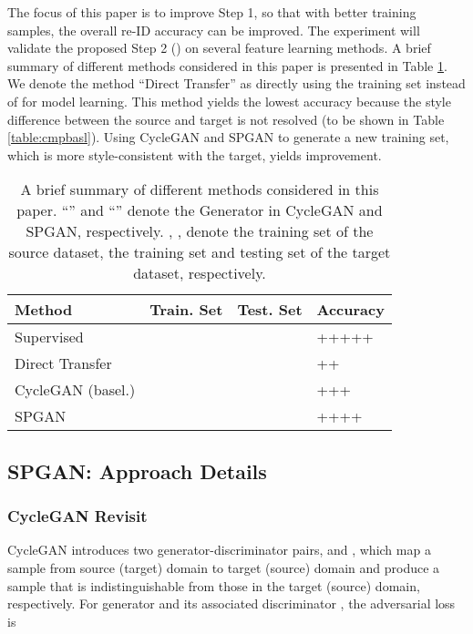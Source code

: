 \documentclass[10pt,twocolumn,letterpaper]{article}
\begin{document}
The focus of this paper is to improve Step 1, so that with better training samples, the overall re-ID accuracy can be improved. The experiment will validate the proposed Step 2 () on several feature learning  methods. A brief summary of different methods considered in this paper is presented in Table \ref{table:summary}. We denote the method ``Direct Transfer'' as directly using the training set  instead of  for model learning. This method yields the lowest accuracy because the style difference between the source and target is not resolved (to be shown in Table \ref{table:cmpbasl}). Using CycleGAN and SPGAN to generate a new training set, which is more style-consistent with the target, yields improvement.

\setlength{\tabcolsep}{4.6pt}
\begin{table}
\setlength{\abovecaptionskip}{-0.1cm} 
\setlength{\belowcaptionskip}{-0.3cm}
\begin{center}
\begin{tabular}{l|ccl}
\hline
Method&Train. Set&Test. Set&Accuracy\\
\hline
\hline
Supervised   &  &   & +++++\\
Direct Transfer   &   &   & ++ \\
CycleGAN (basel.)   &  &    & +++\\
SPGAN   &   &    & ++++\\
\hline
\end{tabular}
\end{center}
\setlength{\abovecaptionskip}{0cm}
\caption{A brief summary of different methods considered in this paper. ``'' and ``'' denote the Generator in CycleGAN and SPGAN, respectively. , ,   denote the training set of the source dataset, the training set and testing set of the target dataset, respectively.}
\label{table:summary}
\end{table}
\subsection{SPGAN: Approach Details}\label{SPGAN}
\subsubsection{CycleGAN Revisit}
CycleGAN introduces two generator-discriminator pairs,  and , which map a sample from source (target) domain to target (source) domain and produce a sample that is indistinguishable from those in the target (source) domain, respectively.
For generator  and its associated discriminator , the adversarial loss is
\end{document}
